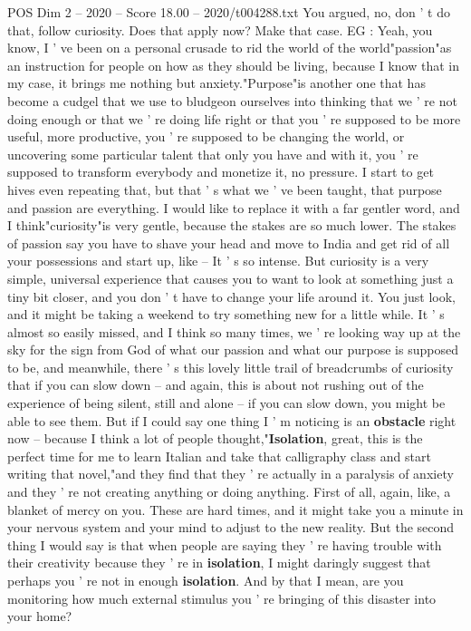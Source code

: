 \begin{textsample}{POS Dim 2 – 2020 – Score 18.00 – 2020/t004288.txt}
You argued, no, don ' t do that, follow curiosity.
Does that apply now?
Make that case.
EG : Yeah, you know, I ' ve been on a personal crusade to rid the world of the world"passion"as an instruction for people on how as they should be living, because I know that in my case, it brings me nothing but anxiety."Purpose"is another one that has become a cudgel that we use to bludgeon ourselves into thinking that we ' re not doing enough or that we ' re doing life right or that you ' re supposed to be more useful, more productive, you ' re supposed to be changing the world, or uncovering some particular talent that only you have and with it, you ' re supposed to transform everybody and monetize it, no pressure.
I start to get hives even repeating that, but that ' s what we ' ve been taught, that purpose and passion are everything.
I would like to replace it with a far gentler word, and I think"curiosity"is very gentle, because the stakes are so much lower.
The stakes of passion say you have to shave your head and move to India and get rid of all your possessions and start up, like -- It ' s so intense.
But curiosity is a very simple, universal experience that causes you to want to look at something just a tiny bit closer, and you don ' t have to change your life around it.
You just look, and it might be taking a weekend to try something new for a little while.
It ' s almost so easily missed, and I think so many times, we ' re looking way up at the sky for the sign from God of what our passion and what our purpose is supposed to be, and meanwhile, there ' s this lovely little trail of breadcrumbs of curiosity that if you can slow down -- and again, this is about not rushing out of the experience of being silent, still and alone -- if you can slow down, you might be able to see them.
But if I could say one thing I ' m noticing is an \textbf{obstacle} right now -- because I think a lot of people thought,"\textbf{Isolation}, great, this is the perfect time for me to learn Italian and take that calligraphy class and start writing that novel,"and they find that they ' re actually in a paralysis of anxiety and they ' re not creating anything or doing anything.
First of all, again, like, a blanket of mercy on you.
These are hard times, and it might take you a minute in your nervous system and your mind to adjust to the new reality.
But the second thing I would say is that when people are saying they ' re having trouble with their creativity because they ' re in \textbf{isolation}, I might daringly suggest that perhaps you ' re not in enough \textbf{isolation}.
And by that I mean, are you monitoring how much external stimulus you ' re bringing of this disaster into your home?

\end{textsample}
